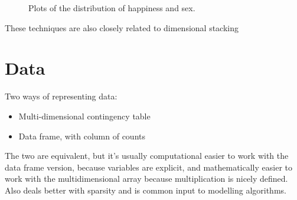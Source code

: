 \documentclass[letterpaper,oneside]{scrartcl}
\begin{document}
\begin{figure}[htbp]
  \caption{Plots of the distribution of happiness and sex.}
  \label{fig:fact-simple}
\end{figure}


These techniques are also closely related to dimensional stacking \citep{leblanc:1990}

% 


%
%
%
%

\section{Data}
\label{sec:data}

Two ways of representing data:

\begin{itemize}
  \item Multi-dimensional contingency table
  \item Data frame, with column of counts
\end{itemize}

The two are equivalent, but it's usually computational easier to work with the data frame version, because variables are explicit, and mathematically easier to work with the multidimensional array because multiplication is nicely defined.  Also deals better with sparsity and is common input to modelling algorithms.
\end{document}
